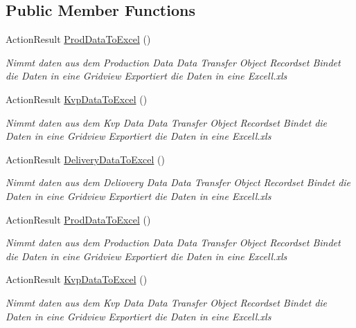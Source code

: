 \subsection*{Public Member Functions}
\begin{DoxyCompactItemize}
\item 
Action\+Result \hyperlink{classkpi_mvc_api_1_1_controllers_1_1_export_controller_a7f779c9cca92a11fd9c37bfef15c0ad4}{Prod\+Data\+To\+Excel} ()
\begin{DoxyCompactList}\small\item\em Nimmt daten aus dem Production Data Data Transfer Object Recordset Bindet die Daten in eine Gridview Exportiert die Daten in eine Excell.\+xls \end{DoxyCompactList}\item 
Action\+Result \hyperlink{classkpi_mvc_api_1_1_controllers_1_1_export_controller_a5350dfcc0605aeb646490cdedd3374bc}{Kvp\+Data\+To\+Excel} ()
\begin{DoxyCompactList}\small\item\em Nimmt daten aus dem Kvp Data Data Transfer Object Recordset Bindet die Daten in eine Gridview Exportiert die Daten in eine Excell.\+xls \end{DoxyCompactList}\item 
Action\+Result \hyperlink{classkpi_mvc_api_1_1_controllers_1_1_export_controller_a9bfabbfc7273a1c541a8e3bd33ea08e6}{Delivery\+Data\+To\+Excel} ()
\begin{DoxyCompactList}\small\item\em Nimmt daten aus dem Deliovery Data Data Transfer Object Recordset Bindet die Daten in eine Gridview Exportiert die Daten in eine Excell.\+xls \end{DoxyCompactList}\item 
Action\+Result \hyperlink{classkpi_mvc_api_1_1_controllers_1_1_export_controller_a7f779c9cca92a11fd9c37bfef15c0ad4}{Prod\+Data\+To\+Excel} ()
\begin{DoxyCompactList}\small\item\em Nimmt daten aus dem Production Data Data Transfer Object Recordset Bindet die Daten in eine Gridview Exportiert die Daten in eine Excell.\+xls \end{DoxyCompactList}\item 
Action\+Result \hyperlink{classkpi_mvc_api_1_1_controllers_1_1_export_controller_a5350dfcc0605aeb646490cdedd3374bc}{Kvp\+Data\+To\+Excel} ()
\begin{DoxyCompactList}\small\item\em Nimmt daten aus dem Kvp Data Data Transfer Object Recordset Bindet die Daten in eine Gridview Exportiert die Daten in eine Excell.\+xls \end{DoxyCompactList}\item 

\end{DoxyCompactItemize}
